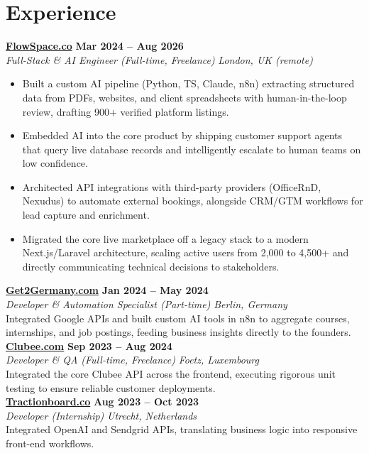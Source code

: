 \documentclass[a4paper,10pt]{article}
\newcommand{\role}[4]{%
 \textbf{#1} \hfill \textbf{#2}\\[1pt]%
 \textit{#3} \hfill \textit{#4}\\[2pt]%
}
\begin{document}
\section{Experience}

\role{\href{https://flowspace.co}{FlowSpace.co}}{Mar 2024 -- Aug 2026}{Full-Stack \& AI Engineer (Full-time, Freelance)}{London, UK (remote)}
\begin{itemize}
 \item Built a custom AI pipeline (Python, TS, Claude, n8n) extracting structured data from PDFs, websites, and client spreadsheets with human-in-the-loop review, drafting 900+ verified platform listings.
 \item Embedded AI into the core product by shipping customer support agents that query live database records and intelligently escalate to human teams on low confidence.
 \item Architected API integrations with third-party providers (OfficeRnD, Nexudus) to automate external bookings, alongside CRM/GTM workflows for lead capture and enrichment.
 \item Migrated the core live marketplace off a legacy stack to a modern Next.js/Laravel architecture, scaling active users from 2,000 to 4,500+ and directly communicating technical decisions to stakeholders.
\end{itemize}

\role{\href{https://get2germany.com}{Get2Germany.com}}{Jan 2024 -- May 2024}{Developer \& Automation Specialist (Part-time)}{Berlin, Germany}
Integrated Google APIs and built custom AI tools in n8n to aggregate courses, internships, and job postings, feeding business insights directly to the founders.\\[1pt]

\role{\href{https://clubee.com}{Clubee.com}}{Sep 2023 -- Aug 2024}{Developer \& QA (Full-time, Freelance)}{Foetz, Luxembourg}
Integrated the core Clubee API across the frontend, executing rigorous unit testing to ensure reliable customer deployments.\\[1pt]

\role{\href{https://tractionboard.co}{Tractionboard.co}}{Aug 2023 -- Oct 2023}{Developer (Internship)}{Utrecht, Netherlands}
Integrated OpenAI and Sendgrid APIs, translating business logic into responsive front-end workflows.

\end{document}
